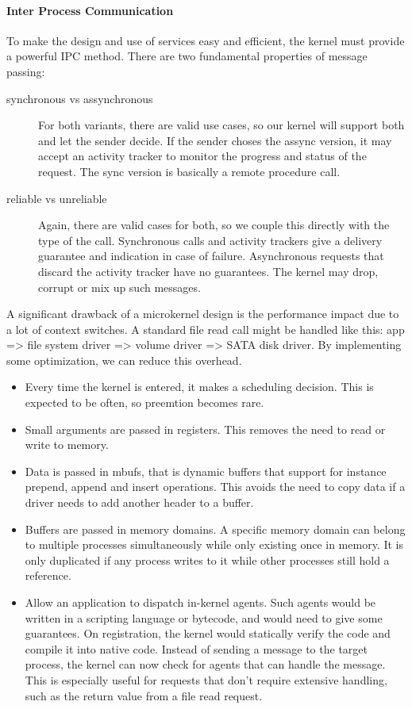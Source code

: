 \documentclass[a4paper]{article}
\begin{document}
\paragraph{Inter Process Communication} To make the design and use of services easy and efficient, the kernel must provide a powerful IPC method. There are two fundamental properties of message passing:

\begin{description}
  \item[synchronous vs assynchronous] For both variants, there are valid use cases, so our kernel will support both and let the sender decide. If the sender choses the assync version, it may accept an activity tracker to monitor the progress and status of the request. The sync version is basically a remote procedure call.
  \item[reliable vs unreliable] Again, there are valid cases for both, so we couple this directly with the type of the call. Synchronous calls and activity trackers give a delivery guarantee and indication in case of failure. Asynchronous requests that discard the activity tracker have no guarantees. The kernel may drop, corrupt or mix up such messages.
\end{description}

A significant drawback of a microkernel design is the performance impact due to a lot of context switches. A standard file read call might be handled like this: app => file system driver => volume driver => SATA disk driver. By implementing some optimization, we can reduce this overhead.
\begin{itemize}
  \item Every time the kernel is entered, it makes a scheduling decision. This is expected to be often, so preemtion becomes rare.
  \item Small arguments are passed in registers. This removes the need to read or write to memory.
  \item Data is passed in mbufs, that is dynamic buffers that support for instance prepend, append and insert operations. This avoids the need to copy data if a driver needs to add another header to a buffer.
  \item Buffers are passed in memory domains. A specific memory domain can belong to multiple processes simultaneously while only existing once in memory. It is only duplicated if any process writes to it while other processes still hold a reference.
  \item Allow an application to dispatch in-kernel agents. Such agents would be written in a scripting language or bytecode, and would need to give some guarantees. On registration, the kernel would statically verify the code and compile it into native code. Instead of sending a message to the target process, the kernel can now check for agents that can handle the message. This is especially useful for requests that don't require extensive handling, such as the return value from a file read request.
\end{itemize}
\end{document}
